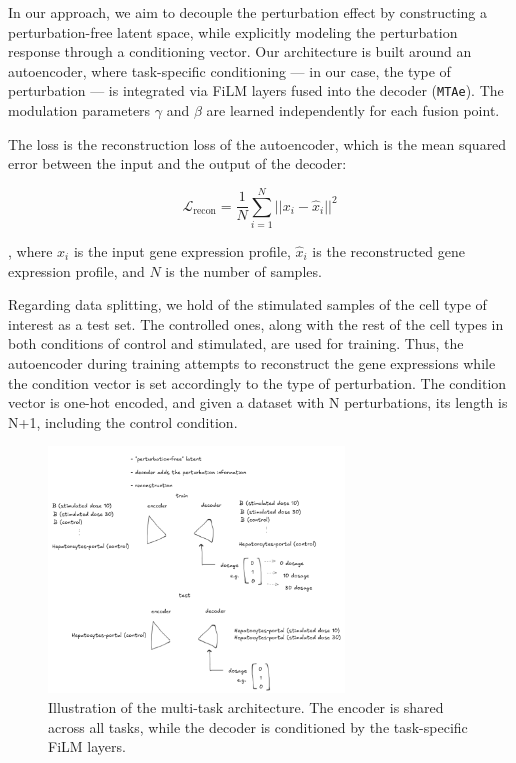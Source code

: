 \documentclass[12pt, a4paper]{article}
\begin{document}
In our approach, we aim to decouple the perturbation effect by constructing a perturbation-free latent space, while explicitly modeling the perturbation response through a conditioning vector. Our architecture is built around an autoencoder, where task-specific conditioning — in our case, the type of perturbation — is integrated via FiLM layers fused into the decoder (\verb|MTAe|). The modulation parameters $\gamma$ and $\beta$ are learned independently for each fusion point.

The loss is the reconstruction loss of the autoencoder, which is the mean squared error between the input and the output of the decoder:

\[
\mathcal{L}_{\text{recon}} = \frac{1}{N} \sum_{i=1}^{N} ||x_i - \hat{x}_i||^2 \]


, where $x_i$ is the input gene expression profile, $\hat{x}_i$ is the reconstructed gene expression profile, and $N$ is the number of samples.

Regarding data splitting, we hold of the stimulated samples of the cell type of interest as a test set. The controlled ones, along with the rest of the cell types in both conditions of control and stimulated, are used for training. Thus, the autoencoder during training attempts to reconstruct the gene expressions while the condition vector is set accordingly to the type of perturbation. The condition vector is one-hot encoded, and given a dataset with N perturbations, its length is N+1, including the control condition.

\begin{figure}
    \centering
    \includegraphics[width=0.7\textwidth]{ae_sketch.png}
    \caption{Illustration of the multi-task architecture. The encoder is shared across all tasks, while the decoder is conditioned by the task-specific FiLM layers.}
\end{figure}
\end{document}
